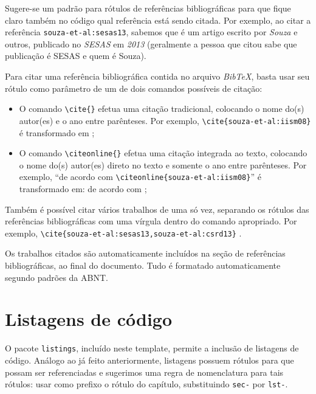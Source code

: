 Sugere-se um padrão para rótulos de referências bibliográficas para que fique claro também no código \latex qual referência está sendo citada. Por exemplo, ao citar a referência \texttt{souza-et-al:sesas13}, sabemos que é um artigo escrito por \emph{Souza} e outros, publicado no \emph{SESAS} em \emph{2013} (geralmente a pessoa que citou sabe que publicação é SESAS e quem é Souza).

Para citar uma referência bibliográfica contida no arquivo \emph{BibTeX}, basta usar seu rótulo como parâmetro de um de dois comandos possíveis de citação:

\begin{itemize}
	\item O comando \texttt{\textbackslash cite\{\}} efetua uma citação tradicional, colocando o nome do(s) autor(es) e o ano entre parênteses. Por exemplo, \texttt{\textbackslash cite\{souza-et-al:iism08\}} é transformado em \cite{souza-et-al:iism08};
	
	\item O comando \texttt{\textbackslash citeonline\{\}} efetua uma citação integrada ao texto, colocando o nome do(s) autor(es) direto no texto e somente o ano entre parênteses. Por exemplo, ``de acordo com \texttt{\textbackslash citeonline\{souza-et-al:iism08\}}'' é transformado em: de acordo com ;
\end{itemize}

Também é possível citar vários trabalhos de uma só vez, separando os rótulos das referências bibliográficas com uma vírgula dentro do comando apropriado. Por exemplo, \texttt{\textbackslash cite\{souza-et-al:sesas13,souza-et-al:csrd13\}} \cite{souza-et-al:sesas13,souza-et-al:csrd13}.

Os trabalhos citados são automaticamente incluídos na seção de referências bibliográficas, ao final do documento. Tudo é formatado automaticamente segundo padrões da ABNT.



\section{Listagens de código}
\label{sec-intro-listagens}

O pacote \texttt{listings}, incluído neste template, permite a inclusão de listagens de código. Análogo ao já feito anteriormente, listagens possuem rótulos para que possam ser referenciadas e sugerimos uma regra de nomenclatura para tais rótulos: usar como prefixo o rótulo do capítulo, substituindo \texttt{sec-} por \texttt{lst-}.


